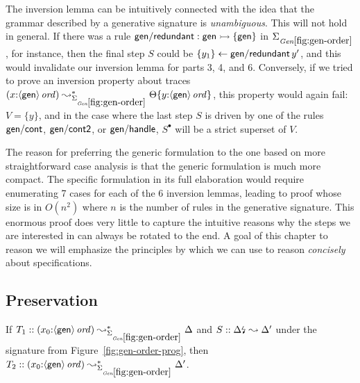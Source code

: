 The inversion lemma can be intuitively connected with the
idea that the grammar described by a generative signature is {\it
  unambiguous}. This will not hold in general. If there was
a rule ${\sf gen/redundant} : {\sf gen} \rightarrowtail \{ {\sf gen} \}$ in
$\Sigma_{\it Gen\ref{fig:gen-order}}$, for instance, then the final
step $S$ could be
$\{{y_1}\} \leftarrow {{\sf gen/redundant}\,y'}$, and this would invalidate our
inversion lemma
for parts 3, 4, and 6. 
Conversely, if we tried to prove an inversion
property about traces $(x{:}\istrue{\susp{\sf gen}})
\leadsto^*_{\siggenorder} \tackon{\Theta}{y{:}\istrue{\susp{{\sf
        gen}}}}$, this property would again fail: $V = \{ y
\}$, and in the case where the last step $S$ is driven by one of the
rules ${\sf gen/cont}$, ${\sf gen/cont2}$, or ${\sf gen/handle}$,
$S^{\bullet}$ will be a strict superset of $V$.

The reason for preferring the generic formulation to the one based on
more straightforward case analysis is that the generic formulation is
much more compact. The specific formulation in its full elaboration
would require enumerating 7 cases for each of the 6 inversion lemmas,
leading to proof whose size is in $O(n^2)$ where $n$ is the number of
rules in the generative signature. This enormous proof does very
little to capture the intuitive reasons why the steps we are
interested in can always be rotated to the end. A goal of this chapter
to reason we will emphasize the principles by which we can use to
reason {\it concisely} about specifications.

\subsection{Preservation}

\begin{theorem}\label{thm:siggenorder}
If $T_1 :: (x_0{:}\istrue{\susp{\sf gen}}) \leadsto^*_{\siggenorder} 
   \Delta$ and $S :: {\Delta}{\mbox{\lightning}}_{} \leadsto \Delta'$
under the signature from Figure~\ref{fig:gen-order-prog}, then
$T_2 :: (x_0{:}\istrue{\susp{\sf gen}}) \leadsto^*_{\siggenorder} 
   \Delta'$.
\end{theorem}


